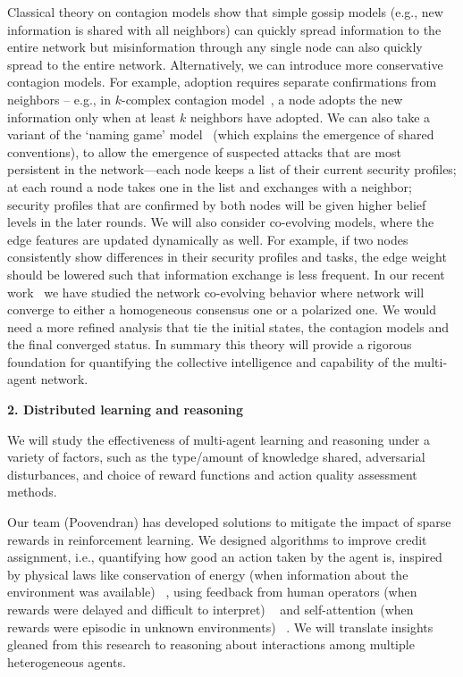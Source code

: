 \documentclass{NSF}
\begin{document}
Classical theory on contagion models show that simple gossip models (e.g., new information is shared with all neighbors) can quickly spread information to the entire network but misinformation through any single node can also quickly spread to the entire network.
Alternatively, we can introduce more conservative contagion models.
For example, adoption requires separate confirmations from neighbors -- e.g., in $k$-complex contagion model~\cite{Ghasemiesfeh:2013:CCW,ebrahimi17complex,gao16general}, a node adopts the new information only when at least $k$ neighbors have adopted.
We can also take a variant of the `naming game' model~\cite{gao2017engineering} (which explains the emergence of shared conventions), to allow the emergence of suspected attacks that are most persistent in the network---each node keeps a list of their current security profiles; at each round a node takes one in the list and exchanges with a neighbor; security profiles that are confirmed by both nodes will be given higher belief levels in the later rounds.
We will also consider co-evolving models, where the edge features are updated dynamically as well.
For example, if two nodes consistently show differences in their security profiles and tasks, the edge weight should be lowered such that information exchange is less frequent.
In our recent work~\cite{wang22coevolution} we have studied the network co-evolving behavior where network will converge to either a homogeneous consensus one or a polarized one.
We would need a more refined analysis that tie the initial states, the contagion models and the final converged status.
In summary this theory will provide a rigorous foundation for quantifying the collective intelligence and capability of the multi-agent network.


\noindent \textbf{2. Distributed learning and reasoning}

We will study the effectiveness of multi-agent learning and reasoning under a variety of factors, such as the type/amount of knowledge shared, adversarial disturbances, and choice of reward functions and action quality assessment methods.

Our team (Poovendran) has developed solutions to mitigate the impact of sparse rewards in reinforcement learning. 
We designed algorithms to improve credit assignment, i.e., quantifying how good an action taken by the agent is, inspired by physical laws like conservation of energy (when information about the environment was available) ~\cite{xiao2022shaping, xiao2019potential}, using feedback from human operators (when rewards were delayed and difficult to interpret) ~\cite{xiao2020fresh} and self-attention (when rewards were episodic in unknown environments) ~\cite{xiao2022agent}.  
We will translate insights gleaned from this research to reasoning about interactions among multiple heterogeneous agents.
\end{document}
